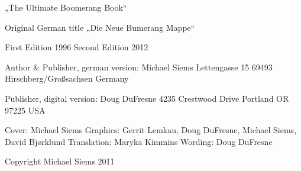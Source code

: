 „The Ultimate Boomerang Book“

Original German title „Die Neue Bumerang Mappe“

First Edition 1996
Second Edition 2012

Author & Publisher, german version: 
Michael Siems
Lettengasse 15
69493 Hirschberg/Großsachsen
Germany

Publisher, digital version: 
Doug DuFresne
4235 Crestwood Drive
Portland OR 97225
USA


Cover: Michael Siems
Graphics: Gerrit Lemkau, Doug DuFresne, Michael Siems, David Bjørklund
Translation: Maryka Kimmins
Wording: Doug DuFresne




Copyright Michael Siems 2011